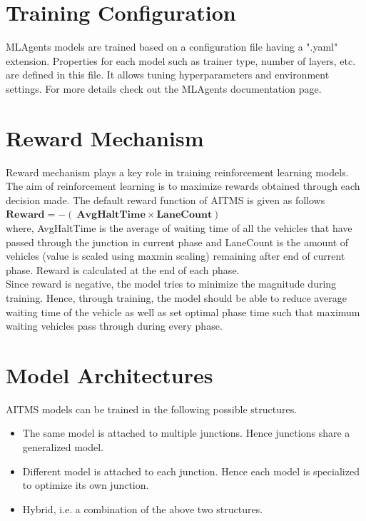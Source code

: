 \documentclass[openany,12pt]{report}
\begin{document}
		\section{Training Configuration}
		\hspace*{0.5 in}MLAgents models are trained based on a configuration file having a ".yaml" extension. Properties for each model such as trainer type, number of layers, etc. are defined in this file. 
		It allows tuning hyperparameters and environment settings. For more details check out the MLAgents documentation page.
		
		\newpage
		\section{Reward Mechanism}
		\hspace*{0.5 in}Reward mechanism plays a key role in training reinforcement learning models. The aim of reinforcement learning is to maximize rewards obtained through each decision made. The default reward function of AITMS is given as follows\\ 
		\hspace*{1 in}$\mathbf{Reward = - (\ AvgHaltTime \times LaneCount )\ }$\\
		where, AvgHaltTime is the average of waiting time of all the vehicles that have passed through the junction in current phase and LaneCount is the amount of vehicles (value is scaled using maxmin scaling) remaining after end of current phase. Reward is calculated at the end of each phase.\\
		\hspace*{0.5 in} Since reward is negative, the model tries to minimize the magnitude during training. Hence, through training, the model should be able to reduce average waiting time of the vehicle as well as set optimal phase time such that maximum waiting vehicles pass through during every phase.\\
		
		\section{Model Architectures}
		\hspace*{0.5 in} AITMS models can be trained in the following possible structures.
		\begin{itemize}
			\item{The same model is attached to multiple junctions. Hence junctions share a generalized model.}
			\item{Different model is attached to each junction. Hence each model is specialized to optimize its own junction.}
			\item{Hybrid, i.e. a combination of the above two structures.}
		\end{itemize}
		\newpage
\end{document}
